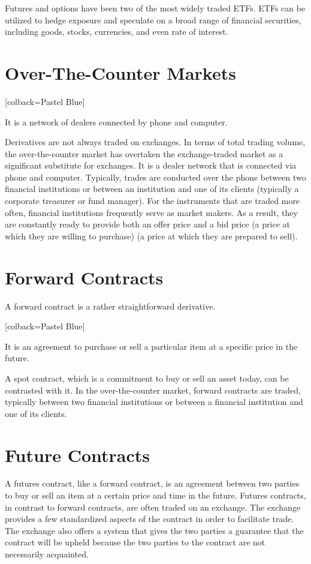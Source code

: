  Futures and options have been two of the most widely traded ETFs. ETFs can be utilized to hedge exposure and speculate on a broad range of financial securities, including goods, stocks, currencies, and even rate of interest.
\section{Over-The-Counter Markets}

\begin{tcolorbox}
	[colback=Pastel Blue]
	\begin{definition}
		 It is a network of dealers connected by phone and computer.
	\end{definition}
\end{tcolorbox}

\noindent Derivatives are not always traded on exchanges. In terms of total trading volume, the over-the-counter market has overtaken the exchange-traded market as a significant substitute for exchanges. It is a dealer network that is connected via phone and computer. Typically, trades are conducted over the phone between two financial institutions or between an institution and one of its clients (typically a corporate treasurer or fund manager). For the instruments that are traded more often, financial institutions frequently serve as market makers. As a result, they are constantly ready to provide both an offer price and a bid price (a price at which they are willing to purchase) (a price at which they are prepared to sell).
\section{Forward Contracts}
\noindent A forward contract is a rather straightforward derivative. 
\begin{tcolorbox}
	[colback=Pastel Blue]
	\begin{definition}
		It is an agreement to purchase or sell a particular item at a specific price in the future.
	\end{definition}
\end{tcolorbox}
 \noindent A spot contract, which is a commitment to buy or sell an asset today, can be contrasted with it. In the over-the-counter market, forward contracts are traded, typically between two financial institutions or between a financial institution and one of its clients.
\section{Future Contracts}
\noindent A futures contract, like a forward contract, is an agreement between two parties to buy or sell an item at a certain price and time in the future. Futures contracts, in contrast to forward contracts, are often traded on an exchange. The exchange provides a few standardized aspects of the contract in order to facilitate trade. The exchange also offers a system that gives the two parties a guarantee that the contract will be upheld because the two parties to the contract are not necessarily acquainted.
